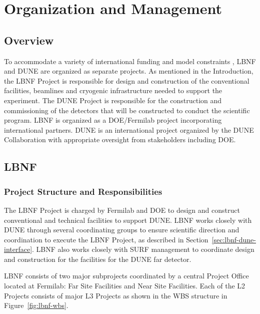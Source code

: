 \chapter{Organization and Management}
\label{v1ch:org-mgmt}

\section{Overview}

To accommodate a variety of international funding and model constraints
, LBNF and DUNE are organized as separate projects. As mentioned in the Introduction, the LBNF Project is responsible for design and construction of the conventional facilities, beamlines and cryogenic infrastructure needed to support the experiment.  The DUNE Project is responsible for the construction and commissioning of the detectors that will be constructed to conduct the scientific program.  LBNF is organized as a DOE/Fermilab project incorporating international partners.   DUNE is an international project organized by the DUNE Collaboration with appropriate oversight from stakeholders including DOE. 

\section{LBNF}

\subsection{Project Structure and Responsibilities}

The LBNF Project is charged by Fermilab and DOE to design and construct conventional and technical facilities to support DUNE. LBNF works closely with DUNE through several coordinating groups to ensure scientific direction and coordination to execute the LBNF Project, as described in Section~\ref{sec:lbnf-dune-interface}. LBNF also works closely with SURF management to coordinate design and construction for the facilities for the DUNE far detector. 

LBNF consists of two major subprojects coordinated by a central Project Office located at Fermilab: Far Site Facilities and Near Site Facilities. Each of the L2 Projects consists of major L3 Projects as shown in the WBS structure in Figure~\ref{fig:lbnf-wbs}.

